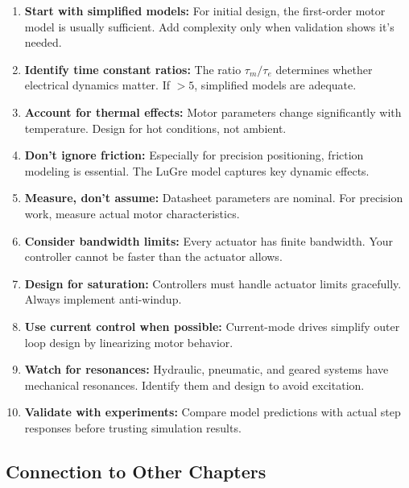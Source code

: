 \begin{enumerate}
    \item \textbf{Start with simplified models:} For initial design, the first-order motor model is usually sufficient. Add complexity only when validation shows it's needed.

    \item \textbf{Identify time constant ratios:} The ratio $\tau_m/\tau_e$ determines whether electrical dynamics matter. If $> 5$, simplified models are adequate.

    \item \textbf{Account for thermal effects:} Motor parameters change significantly with temperature. Design for hot conditions, not ambient.

    \item \textbf{Don't ignore friction:} Especially for precision positioning, friction modeling is essential. The LuGre model captures key dynamic effects.

    \item \textbf{Measure, don't assume:} Datasheet parameters are nominal. For precision work, measure actual motor characteristics.

    \item \textbf{Consider bandwidth limits:} Every actuator has finite bandwidth. Your controller cannot be faster than the actuator allows.

    \item \textbf{Design for saturation:} Controllers must handle actuator limits gracefully. Always implement anti-windup.

    \item \textbf{Use current control when possible:} Current-mode drives simplify outer loop design by linearizing motor behavior.

    \item \textbf{Watch for resonances:} Hydraulic, pneumatic, and geared systems have mechanical resonances. Identify them and design to avoid excitation.

    \item \textbf{Validate with experiments:} Compare model predictions with actual step responses before trusting simulation results.
\end{enumerate}

\subsection{Connection to Other Chapters}

